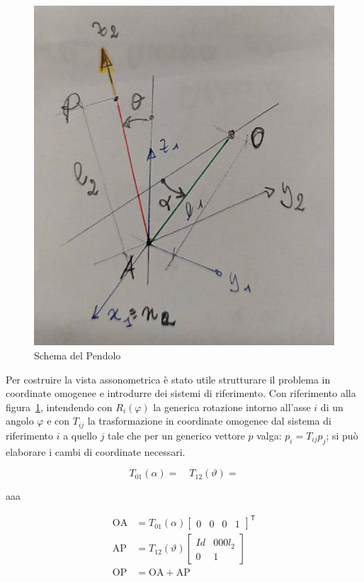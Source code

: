 \begin{figure}
	\centering
	\includegraphics[height=.4\textheight]{pendolo_schema_TEMPORANEO.png}
	\caption{Schema del Pendolo}
	\label{fig:pendolo_schema}
\end{figure}

Per costruire la vista assonometrica \`e stato utile strutturare il problema in coordinate omogenee e introdurre dei sistemi di riferimento. Con riferimento alla figura~\ref{fig:pendolo_schema}, intendendo con $R_i(\varphi)$ la generica rotazione intorno all'asse $i$ di un angolo $\varphi$ e con $T_{ij}$ la trasformazione in coordinate omogenee dal sistema di riferimento $i$ a quello $j$ tale che per un generico vettore $p$ valga: $p_i = T_{ij} p_j$; si pu\`o elaborare i cambi di coordinate necessari. 

\begin{equation}
T_{01}(\alpha) = \quad T_{12}(\vartheta) =
\label{eq:cambio_coordinate}
\end{equation}

aaa


\begin{align}
	\mathrm{OA}& = T_{01}(\alpha) \begin{bmatrix} 0& 0 & 0& 1 \end{bmatrix}^\mathsf{T}\label{eq:from_punti_in_coord_0} \\
	\mathrm{AP}& = T_{12}(\vartheta) \begin{bmatrix}Id & 000l_2\\ 0 &1\end{bmatrix} \\
	\mathrm{OP}& = \mathrm{OA}+\mathrm{AP}
\label{eq:to_punti_in_coord_0}
\end{align}



